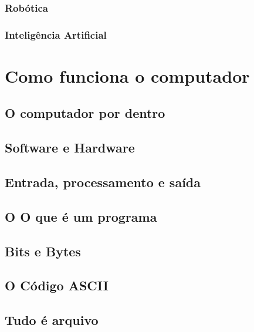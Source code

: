 \subsection[Robótica]{Robótica}

	
\subsection[Inteligência Artificial]{Inteligência Artificial}


\chapter[Como funciona o computador]{Como funciona o computador}

\section[O computador por dentro]{O computador por dentro}


\section[Software e Hardware]{Software e Hardware}


\section[Entrada, processamento e saída]{Entrada, processamento e saída}


\section[O que é um programa]{O O que é um programa}


\section[Bits e Bytes]{Bits e Bytes}


\section[O Código ASCII]{O Código ASCII}


\section[Tudo é arquivo]{Tudo é arquivo}


